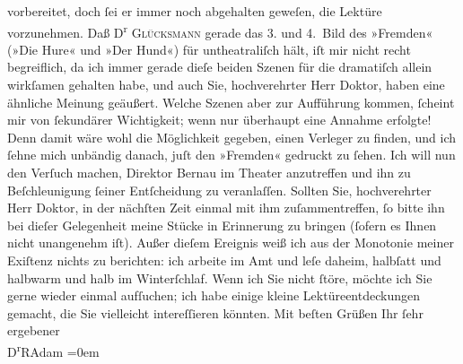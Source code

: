 \begin{ledgroupsized}[t]{13cm}
               vorbereitet, doch ſei er immer noch abgehalten geweſen, die Lektüre vorzunehmen.\pend
           \pstart
           Daß D\textsuperscript{r}{ }\textsc{Glücksmann} gerade das 3. und 4. Bild des »Fremden«
                  (»Die Hure« und »Der Hund«) für untheatraliſch
               hält, iſt mir nicht recht begreiflich, da ich immer gerade dieſe beiden Szenen für
               die dramatiſch allein wirkſamen gehalten habe, und auch Sie, hochverehrter Herr
               Doktor, haben eine ähnliche Meinung geäußert.\pend
           \pstart
           Welche Szenen aber zur Aufführung kommen, ſcheint mir von ſekundärer Wichtigkeit;
               wenn nur überhaupt eine Annahme erfolgte! Denn damit wäre wohl die Möglichkeit
               gegeben, einen Verleger zu finden, und ich ſehne mich unbändig danach, juſt den »Fremden« gedruckt zu ſehen.\pend
           \pstart
           Ich will nun den Verſuch machen, Direktor Bernau im Theater anzu{\pb}treffen
               und ihn zu Beſchleunigung ſeiner Entſcheidung zu veranlaſſen. Sollten Sie,
               hochverehrter Herr Doktor, in der nächſten Zeit einmal mit ihm zuſammentreffen, ſo
               bitte ihn bei dieſer Gelegenheit meine Stücke in Erinnerung zu bringen (ſofern es
               Ihnen nicht unangenehm iſt).\pend
           \pstart
           Außer dieſem Ereignis weiß ich aus der Monotonie meiner Exiſtenz nichts zu berichten:
               ich arbeite im Amt und leſe daheim, halbſatt und halbwarm und halb im
               Winterſchlaf.\pend
           \pstart
           Wenn ich Sie nicht ſtöre, möchte ich Sie gerne wieder einmal aufſuchen; ich habe
               einige kleine Lektüreentdeckungen gemacht, die Sie vielleicht intereſſieren
               könnten.\pend
           \pstart
           Mit beſten Grüßen Ihr ſehr{\\[\baselineskip]}ergebener{\\[\baselineskip]}\spacefill\mbox{D\textsuperscript{r}RAdam}\pend
           \leftskip=0em{}
         

\end{ledgroupsized}
